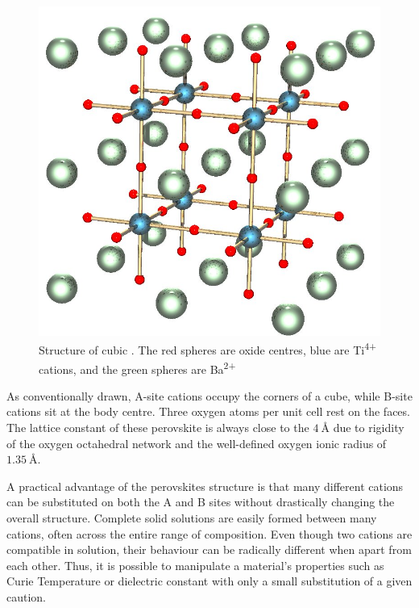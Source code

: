 \documentclass[%
 aip,
 amsmath,amssymb,
 reprint, floatfix%
]{revtex4-1}
\begin{document}
    \begin{figure}
        \centering
        \includegraphics[scale = 0.3]{Figures/Perovskite.jpg}
        \caption{Structure of cubic . The red spheres are oxide centres, blue are Ti\textsuperscript{4+} cations, and the green spheres are Ba\textsuperscript{2+}}
        \label{fig:my_label}
    \end{figure}
    \par
    As conventionally drawn, A-site cations occupy the corners of a cube, while B-site cations sit at the body centre. Three oxygen atoms per unit cell rest on the faces. The lattice constant of these perovskite is always close to the $\SI{4}{\angstrom}$ due to rigidity of the oxygen octahedral network and the well-defined oxygen ionic radius of $\SI{1.35}{\angstrom}$.
    \par
    A practical advantage of the perovskites structure is that many different cations can be substituted on both the A and B sites without drastically changing the overall structure. Complete solid solutions are easily formed between many cations, often across the entire range of composition. Even though two cations are compatible in solution, their behaviour can be radically different when apart from each other. Thus, it is possible to manipulate a material's properties such as Curie Temperature or dielectric constant with only a small substitution of a given caution.
\end{document}
